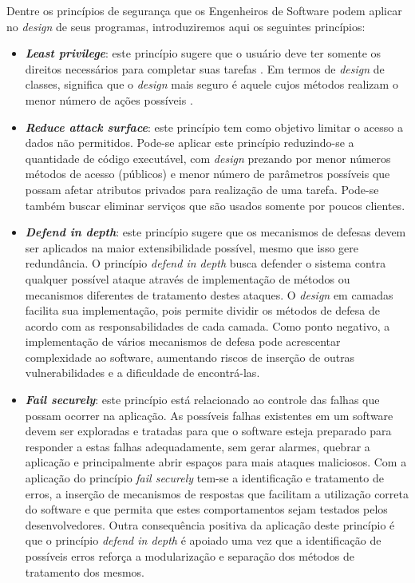 %

Dentre os princípios de segurança que os Engenheiros de Software podem aplicar no \emph{design} de seus programas, introduziremos aqui os seguintes princípios:

\begin{itemize}
\item \textbf{\emph{Least privilege}}: este princípio sugere que o usuário deve ter somente os direitos necessários para completar suas tarefas \cite{bishop2003}. Em termos de \emph{design} de classes, significa que o \emph{design} mais seguro é aquele cujos métodos realizam o menor número de ações possíveis \cite{a1lshammari2009}.

\item \textbf{\emph{Reduce attack surface}}: este princípio tem como objetivo limitar o acesso a dados não permitidos. Pode-se aplicar este princípio reduzindo-se a quantidade de código executável, com \emph{design} prezando por menor números métodos de acesso (públicos) e menor número de parâmetros possíveis que possam afetar atributos privados para realização de uma tarefa. Pode-se também buscar eliminar serviços que são usados somente por poucos clientes.

\item \textbf{\emph{Defend in depth}}: este princípio sugere que os mecanismos de defesas devem ser aplicados na maior extensibilidade possível, mesmo que isso gere redundância. O princípio \emph{defend in depth} busca defender o sistema contra qualquer possível ataque através de implementação de métodos ou mecanismos diferentes de tratamento destes ataques. O \emph{design} em camadas facilita sua implementação, pois permite dividir os métodos de defesa de acordo com as responsabilidades de cada camada. Como ponto negativo, a implementação de vários mecanismos de defesa pode acrescentar complexidade ao software, aumentando riscos de inserção de outras vulnerabilidades e a dificuldade de encontrá-las.

\item \textbf{\emph{Fail securely}}: este princípio está relacionado ao controle das falhas que possam ocorrer na aplicação. As possíveis falhas existentes em um software devem ser exploradas e tratadas para que o software esteja preparado para responder a estas falhas adequadamente, sem gerar alarmes, quebrar a aplicação e principalmente abrir espaços para mais ataques maliciosos. Com a aplicação do princípio \emph{fail securely} tem-se a identificação e tratamento de erros, a inserção de mecanismos de respostas que facilitam a utilização correta do software e que permita que estes comportamentos sejam testados pelos desenvolvedores. Outra consequência positiva da aplicação deste princípio é que o princípio \emph{defend in depth} é apoiado uma vez que a identificação de possíveis erros reforça a modularização e separação dos métodos de tratamento dos mesmos.


\end{itemize}
